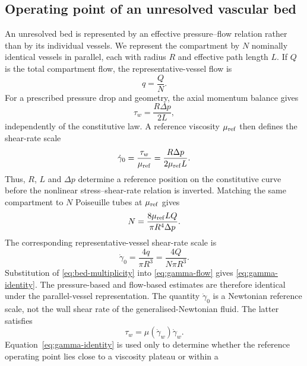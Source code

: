 \documentclass[lineno]{jfm}
\begin{document}
\subsection{Operating point of an unresolved vascular bed}
\label{sec:operating-point}
An unresolved bed is represented by an effective pressure--flow relation rather
than by its individual vessels. We represent the compartment by $N$ nominally
identical vessels in parallel, each with radius $R$ and effective path length
$L$. If $Q$ is the total compartment flow, the representative-vessel flow is
\begin{equation}
q
=
\frac{Q}{N}.
\label{eq:q-per-vessel}
\end{equation}
For a prescribed pressure drop and geometry, the axial momentum balance gives
\begin{equation}
\tau_w
=
\frac{R\Delta p}{2L},
\label{eq:bed-wall-stress}
\end{equation}
independently of the constitutive law. A reference viscosity $\mu_{\rm ref}$
then defines the shear-rate scale
\begin{equation}
\dot{\gamma}_{0}
=
\frac{\tau_w}{\mu_{\rm ref}}
=
\frac{R\Delta p}
{2\mu_{\rm ref}L}.
\label{eq:gamma-identity}
\end{equation}
Thus, $R$, $L$ and $\Delta p$ determine a reference position on the
constitutive curve before the nonlinear stress--shear-rate relation is
inverted.
Matching the same compartment to $N$ Poiseuille tubes at
$\mu_{\rm ref}$ gives
\begin{equation}
N
=
\frac{8\mu_{\rm ref}LQ}
{\pi R^4\Delta p}.
\label{eq:bed-multiplicity}
\end{equation}
The corresponding representative-vessel shear-rate scale is
\begin{equation}
\dot{\gamma}_{0}
=
\frac{4q}{\pi R^3}
=
\frac{4Q}{N\pi R^3}.
\label{eq:gamma-flow}
\end{equation}
Substitution of \eqref{eq:bed-multiplicity} into
\eqref{eq:gamma-flow} gives \eqref{eq:gamma-identity}. The pressure-based and
flow-based estimates are therefore identical under the parallel-vessel
representation.
The quantity $\dot{\gamma}_0$ is a Newtonian reference scale, not the wall
shear rate of the generalised-Newtonian fluid. The latter satisfies
\begin{equation}
\tau_w
=
\mu(\dot{\gamma}_w)\dot{\gamma}_w.
\label{eq:bed-wall-constitutive}
\end{equation}
Equation~\eqref{eq:gamma-identity} is used only to determine whether the
reference operating point lies close to a viscosity plateau or within a
\end{document}
